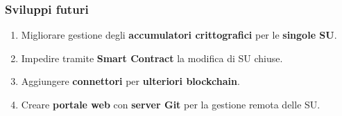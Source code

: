 \documentclass{beamer}
\begin{document}
\begin{frame}
	\frametitle{Sviluppi futuri}
	\begin{enumerate}
		\item Migliorare gestione degli \textbf{accumulatori crittografici} per le \textbf{singole SU}.
		\item Impedire tramite \textbf{Smart Contract} la modifica di SU chiuse.
		\item Aggiungere \textbf{connettori} per \textbf{ulteriori blockchain}.
		\item Creare \textbf{portale web} con \textbf{server Git} per la gestione remota delle SU.
	\end{enumerate}
\end{frame}


\begin{frame}

\end{frame}

\end{document}
